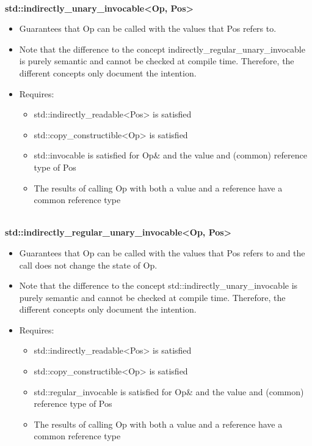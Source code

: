 
\noindent
\hspace*{\fill} \\ %
\textbf{std::indirectly\_unary\_invocable<Op, Pos>}

\begin{itemize}
\item
Guarantees that Op can be called with the values that Pos refers to.

\item
Note that the difference to the concept indirectly\_regular\_unary\_invocable is purely semantic and cannot be checked at compile time. Therefore, the different concepts only document the intention.

\item
Requires:
\begin{itemize}
\item
std::indirectly\_readable<Pos> is satisfied

\item
std::copy\_constructible<Op> is satisfied

\item
std::invocable is satisfied for Op\& and the value and (common) reference type of Pos

\item
The results of calling Op with both a value and a reference have a common reference type
\end{itemize}
\end{itemize}

\noindent
\hspace*{\fill} \\ %
\textbf{std::indirectly\_regular\_unary\_invocable<Op, Pos>}

\begin{itemize}
\item
Guarantees that Op can be called with the values that Pos refers to and the call does not change the state of Op.

\item
Note that the difference to the concept std::indirectly\_unary\_invocable is purely semantic and cannot be checked at compile time. Therefore, the different concepts only document the intention.

\item
Requires:
\begin{itemize}
\item
std::indirectly\_readable<Pos> is satisfied

\item
std::copy\_constructible<Op> is satisfied

\item
std::regular\_invocable is satisfied for Op\& and the value and (common) reference type of Pos

\item
The results of calling Op with both a value and a reference have a common reference type
\end{itemize}
\end{itemize}


